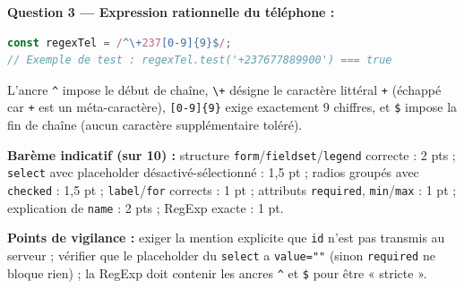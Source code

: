 \documentclass[11pt]{article}
\begin{document}
\begin{corrige}
\textbf{Question 3 — Expression rationnelle du téléphone :}
\begin{lstlisting}[language=JavaScript]
const regexTel = /^\+237[0-9]{9}$/;
// Exemple de test : regexTel.test('+237677889900') === true
\end{lstlisting}
L'ancre \texttt{\^{}} impose le début de chaîne, \texttt{\textbackslash+} désigne le caractère littéral \texttt{+} (échappé car \texttt{+} est un méta-caractère), \texttt{[0-9]\{9\}} exige exactement 9 chiffres, et \texttt{\$} impose la fin de chaîne (aucun caractère supplémentaire toléré).

\textbf{Barème indicatif (sur 10) :} structure \texttt{form}/\texttt{fieldset}/\texttt{legend} correcte : 2 pts ; \texttt{select} avec placeholder désactivé-sélectionné : 1,5 pt ; radios groupés avec \texttt{checked} : 1,5 pt ; \texttt{label}/\texttt{for} corrects : 1 pt ; attributs \texttt{required}, \texttt{min}/\texttt{max} : 1 pt ; explication de \texttt{name} : 2 pts ; RegExp exacte : 1 pt.

\textbf{Points de vigilance :} exiger la mention explicite que \texttt{id} n'est pas transmis au serveur ; vérifier que le placeholder du \texttt{select} a \texttt{value=""} (sinon \texttt{required} ne bloque rien) ; la RegExp doit contenir les ancres \texttt{\^{}} et \texttt{\$} pour être « stricte ».
\end{corrige}
\end{document}
